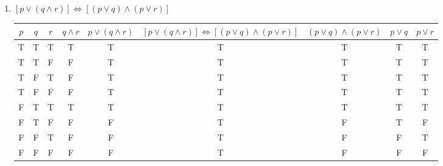 \documentclass[11pt]{article} %
\begin{document}
\begin{enumerate}
\begin{center}
	\end{center}
	\item $[p \lor (q \land r)] \iff [(p\lor q)\land(p\lor r)]$
	\begin{center}
	\hspace*{-2cm}
	\begin{tabular}{|c|c|c|c|c|c|c|c|c|}
	\hline
	$p$ & $q$ & $r$ & $q \land r$ & $p \lor (q\land r)$ & $[p \lor (q \land r)] \iff [(p\lor q)\land(p\lor r)]$ & $(p\lor q)\land(p\lor r)$ & $p\lor q$ & $p\lor r$\\
	\hline
	T & T & T & T & T & T & T & T & T\\
	T & T & F & F & T & T & T & T & T\\
	T & F & T & F & T & T & T & T & T\\
	T & F & F & F & T & T & T & T & T\\
	F & T & T & T & T & T & T & T & T\\
	F & T & F & F & F & T & F & T & F\\
	F & F & T & F & F & T & F & F & T\\
	F & F & F & F & F & T & F & F & F\\
	\hline
	\end{tabular}
	\end{center}
\end{enumerate}
\end{document}
